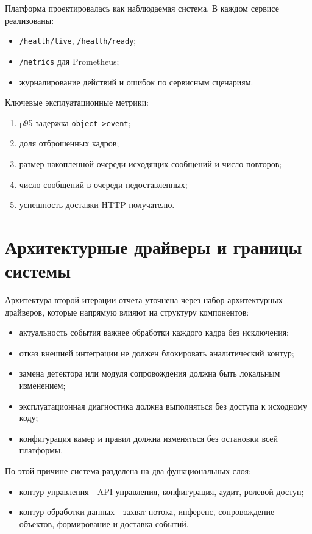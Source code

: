 Платформа проектировалась как наблюдаемая система. В каждом сервисе реализованы:
\begin{itemize}
    \item \texttt{/health/live}, \texttt{/health/ready};
    \item \texttt{/metrics} для Prometheus;
    \item журналирование действий и ошибок по сервисным сценариям.
\end{itemize}

Ключевые эксплуатационные метрики:
\begin{enumerate}
    \item p95 задержка \texttt{object->event};
    \item доля отброшенных кадров;
    \item размер накопленной очереди исходящих сообщений и число повторов;
    \item число сообщений в очереди недоставленных;
    \item успешность доставки HTTP-получателю.
\end{enumerate}

\section{Архитектурные драйверы и границы системы}

Архитектура второй итерации отчета уточнена через набор архитектурных драйверов, которые напрямую влияют на структуру компонентов:
\begin{itemize}
    \item актуальность события важнее обработки каждого кадра без исключения;
    \item отказ внешней интеграции не должен блокировать аналитический контур;
    \item замена детектора или модуля сопровождения должна быть локальным изменением;
    \item эксплуатационная диагностика должна выполняться без доступа к исходному коду;
    \item конфигурация камер и правил должна изменяться без остановки всей платформы.
\end{itemize}

По этой причине система разделена на два функциональных слоя:
\begin{itemize}
    \item контур управления - API управления, конфигурация, аудит, ролевой доступ;
    \item контур обработки данных - захват потока, инференс, сопровождение объектов, формирование и доставка событий.
\end{itemize}

